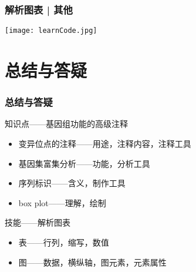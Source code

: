 \begin{frame}
  \frametitle{解析图表 | 其他}
  \begin{center}
    \texttt{[image: learnCode.jpg]}
  \end{center}
\end{frame}

\section{总结与答疑}
\begin{frame}
  \frametitle{总结与答疑}
  \begin{block}{知识点——基因组功能的高级注释}
    \begin{itemize}
      \item 变异位点的注释——用途，注释内容，注释工具
      \item 基因集富集分析——功能，分析工具
      \item 序列标识——含义，制作工具
      \item box plot——理解，绘制
    \end{itemize}
  \end{block}
  \begin{block}{技能——解析图表}
    \begin{itemize}
      \item 表——行列，缩写，数值
      \item 图——数据，横纵轴，图元素，元素属性
    \end{itemize}
  \end{block}
\end{frame}
